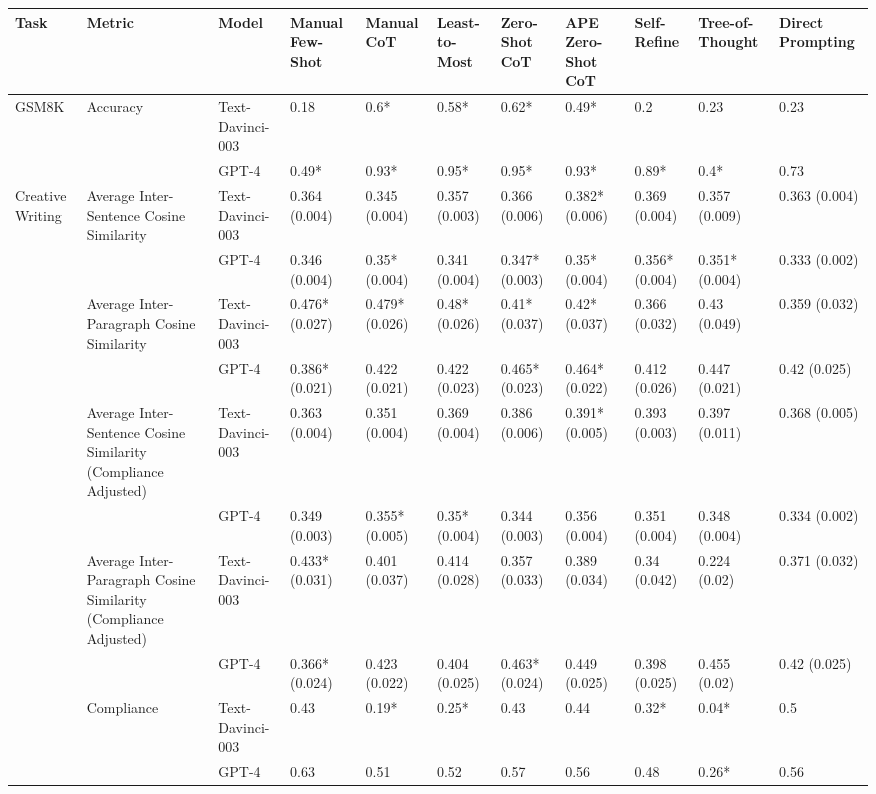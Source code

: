 \begin{tabular}{lllllllllll}
\toprule
Task & Metric & Model & Manual Few-Shot & Manual CoT & Least-to-Most & Zero-Shot CoT & APE Zero-Shot CoT & Self-Refine & Tree-of-Thought & Direct Prompting \\
\midrule
GSM8K & Accuracy & Text-Davinci-003 & 0.18 & 0.6* & 0.58* & 0.62* & 0.49* & 0.2 & 0.23 & 0.23 \\
 &  & GPT-4 & 0.49* & 0.93* & 0.95* & 0.95* & 0.93* & 0.89* & 0.4* & 0.73 \\
Creative Writing & Average Inter-Sentence Cosine Similarity & Text-Davinci-003 & 0.364 (0.004) & 0.345 (0.004) & 0.357 (0.003) & 0.366 (0.006) & 0.382* (0.006) & 0.369 (0.004) & 0.357 (0.009) & 0.363 (0.004) \\
 &  & GPT-4 & 0.346 (0.004) & 0.35* (0.004) & 0.341 (0.004) & 0.347* (0.003) & 0.35* (0.004) & 0.356* (0.004) & 0.351* (0.004) & 0.333 (0.002) \\
 & Average Inter-Paragraph Cosine Similarity & Text-Davinci-003 & 0.476* (0.027) & 0.479* (0.026) & 0.48* (0.026) & 0.41* (0.037) & 0.42* (0.037) & 0.366 (0.032) & 0.43 (0.049) & 0.359 (0.032) \\
 &  & GPT-4 & 0.386* (0.021) & 0.422 (0.021) & 0.422 (0.023) & 0.465* (0.023) & 0.464* (0.022) & 0.412 (0.026) & 0.447 (0.021) & 0.42 (0.025) \\
 & Average Inter-Sentence Cosine Similarity (Compliance Adjusted) & Text-Davinci-003 & 0.363 (0.004) & 0.351 (0.004) & 0.369 (0.004) & 0.386 (0.006) & 0.391* (0.005) & 0.393 (0.003) & 0.397 (0.011) & 0.368 (0.005) \\
 &  & GPT-4 & 0.349 (0.003) & 0.355* (0.005) & 0.35* (0.004) & 0.344 (0.003) & 0.356 (0.004) & 0.351 (0.004) & 0.348 (0.004) & 0.334 (0.002) \\
 & Average Inter-Paragraph Cosine Similarity (Compliance Adjusted) & Text-Davinci-003 & 0.433* (0.031) & 0.401 (0.037) & 0.414 (0.028) & 0.357 (0.033) & 0.389 (0.034) & 0.34 (0.042) & 0.224 (0.02) & 0.371 (0.032) \\
 &  & GPT-4 & 0.366* (0.024) & 0.423 (0.022) & 0.404 (0.025) & 0.463* (0.024) & 0.449 (0.025) & 0.398 (0.025) & 0.455 (0.02) & 0.42 (0.025) \\
 & Compliance & Text-Davinci-003 & 0.43 & 0.19* & 0.25* & 0.43 & 0.44 & 0.32* & 0.04* & 0.5 \\
 &  & GPT-4 & 0.63 & 0.51 & 0.52 & 0.57 & 0.56 & 0.48 & 0.26* & 0.56 \\
\bottomrule
\end{tabular}
